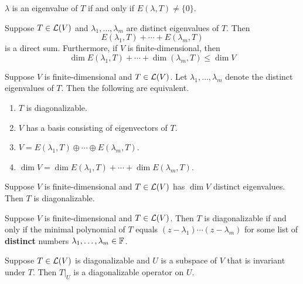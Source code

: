 \documentclass{extarticle}
\begin{document}
\begin{remark}
    \(\lambda\) is an eigenvalue of \(T\) if and only if \(E(\lambda, T) \neq \{0\}\).
\end{remark}

\begin{thm}
    Suppose \(T \in \mathcal{L}(V)\) and \(\lambda_1, \ldots, \lambda_m\) are distinct eigenvalues of \(T\). Then 
    \[E(\lambda_1, T) + \cdots + E(\lambda_m, T)\]
    is a direct sum. Furthermore, if \(V\) is finite-dimensional, then 
    \[\dim E(\lambda_1, T) + \cdots + \dim (\lambda_m, T) \leq \dim V\]
\end{thm}

\begin{thm}
    Suppose \(V\) is finite-dimensional and \(T \in \mathcal{L}(V)\). Let \(\lambda_1, \ldots, \lambda_m\) denote 
    the distinct eigenvalues of \(T\). Then the following are equivalent.
    \begin{enumerate}[label=(\alph*)]
        \item \(T\) is diagonalizable. 
        \item \(V\) has a basis consisting of eigenvectors of \(T\). 
        \item \(V = E(\lambda_1, T) \oplus \cdots \oplus E(\lambda_m, T)\). 
        \item \(\dim V = \dim E(\lambda_1, T) + \cdots + \dim E(\lambda_m, T)\).
    \end{enumerate}
\end{thm}

\begin{corollary}
    Suppose \(V\) is finite-dimensional and \(T \in \mathcal{L}(V)\) has \(\dim V\) distinct eigenvalues. 
    Then \(T\) is diagonalizable.
\end{corollary}

\begin{thm}
    Suppose \(V\) is finite-dimensional and \(T \in \mathcal{L}(V)\). Then \(T\) is diagonalizable if and only if 
    the minimal polynomial of \(T\) equals \((z - \lambda_1)\cdots(z - \lambda_m)\) for some 
    list of \textbf{distinct} numbers \(\lambda_1, \ldots, \lambda_m \in \mathbb{F}\).
\end{thm}

\begin{corollary}
    Suppose \(T \in \mathcal{L}(V)\) is diagonalizable and \(U\) is a subspace of \(V\) that is invariant 
    under \(T\). Then \(T |_U\) is a diagonalizable operator on \(U\). 
\end{corollary}
\end{document}

